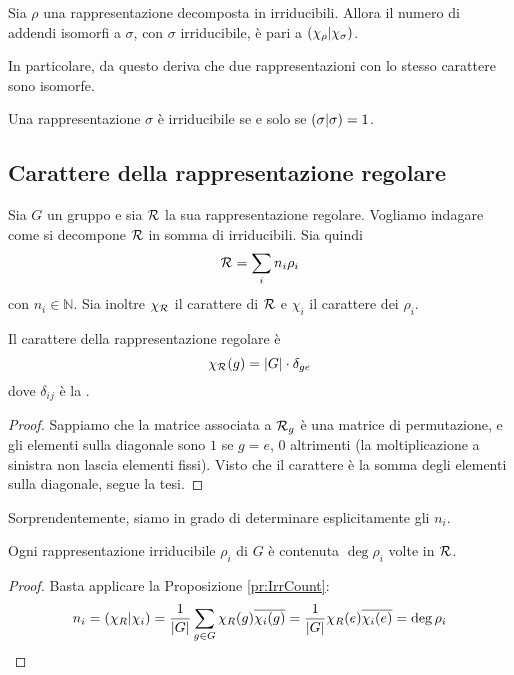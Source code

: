 \begin{myprop}\label{pr:IrrCount}
  Sia $\rho$ una rappresentazione decomposta in irriducibili. Allora il numero di addendi isomorfi a $\sigma$, con $\sigma$ irriducibile, è pari a $\left(\chi_\rho | \chi_\sigma\right)$.
\end{myprop}

In particolare, da questo deriva che due rappresentazioni con lo stesso carattere sono isomorfe.

\begin{mytheorem}
  Una rappresentazione $\sigma$ è irriducibile se e solo se $\left(\sigma | \sigma\right)=1$.
\end{mytheorem}

\subsection{Carattere della rappresentazione regolare}
Sia $G$ un gruppo e sia $\mathcal R$ la sua rappresentazione regolare. Vogliamo indagare come si decompone $\mathcal R$ in somma di irriducibili. Sia quindi
\[
  \mathcal R = \sum_i n_i \rho_i
\]
con $n_i \in \mathbb N$. Sia inoltre $\chi_\mathcal R$ il carattere di $\mathcal R$ e $\chi_i$ il carattere dei $\rho_i$.
  
\begin{myprop}
  Il carattere della rappresentazione regolare è
  \[
  \chi_\mathcal R(g) = \left|G\right| \cdot \delta_{ge}
  \]
  dove $\delta_{ij}$ è la .
\end{myprop}

\begin{proof}
  Sappiamo che la matrice associata a $\mathcal R_g$ è una matrice di permutazione, e gli elementi sulla diagonale sono $1$ se $g=e$, $0$ altrimenti (la moltiplicazione a sinistra non lascia elementi fissi). Visto che il carattere è la somma degli elementi sulla diagonale, segue la tesi.
\end{proof}

Sorprendentemente, siamo in grado di determinare esplicitamente gli $n_i$.
\begin{myprop}
  Ogni rappresentazione irriducibile $\rho_i$ di $G$ è contenuta $\deg \rho_i$ volte in $\mathcal R$.
\end{myprop}

\begin{proof}
  Basta applicare la Proposizione \ref{pr:IrrCount}:
  \[
  n_i=\left(\chi_R | \chi_i\right) = \frac1{\left|G\right|}\sum_{g\in G} \chi_R(g)\overline{\chi_i(g)} = \frac1{\left|G\right|}\chi_R(e)\overline{\chi_i(e)} = \deg \rho_i
  \]

\end{proof}

